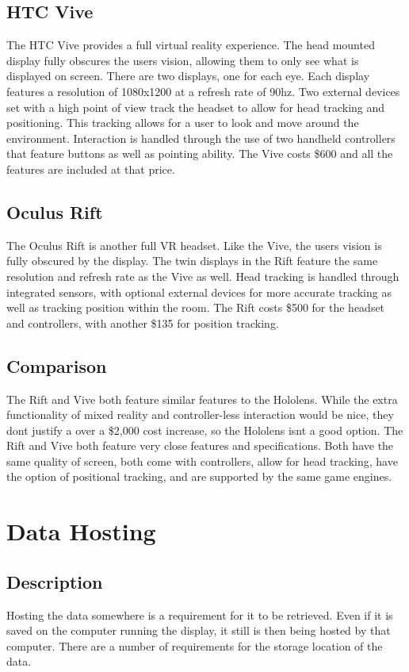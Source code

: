 \documentclass[letterpaper,10pt,onecolumn]{IEEEtran}
\begin{document}
  \subsection {HTC Vive}
    The HTC Vive provides a full virtual reality experience. The head mounted display fully obscures the user\textsc{}s vision, allowing them to only see what is displayed on screen. There are two displays, one for each eye. Each display features a resolution of 1080x1200 at a refresh rate of 90hz. Two external devices set with a high point of view track the headset to allow for head tracking and positioning. This tracking allows for a user to look and move around the environment. Interaction is handled through the use of two handheld controllers that feature buttons as well as pointing ability. The Vive costs \$600 and all the features are included at that price. \cite{vive}

  \subsection {Oculus Rift}
    The Oculus Rift is another full VR headset. Like the Vive, the user\textsc{}s vision is fully obscured by the display. The twin displays in the Rift feature the same resolution and refresh rate as the Vive as well. Head tracking is handled through integrated sensors, with optional external devices for more accurate tracking as well as tracking position within the room. The Rift costs \$500 for the headset and controllers, with another \$135 for position tracking. \cite{rift}
  \subsection {Comparison}
    The Rift and Vive both feature similar features to the Hololens. While the extra functionality of mixed reality and controller-less interaction would be nice, they don\textsc{}t justify a over a \$2,000 cost increase, so the Hololens isn\textsc{}t a good option. The Rift and Vive both feature very close features and specifications. Both have the same quality of screen, both come with controllers, allow for head tracking, have the option of positional tracking, and are supported by the same game engines.

\section{Data Hosting}
  \subsection {Description}
    Hosting the data somewhere is a requirement for it to be retrieved. Even if it is saved on the computer running the display, it still is then being hosted by that computer. There are a number of requirements for the storage location of the data.
\end{document}
